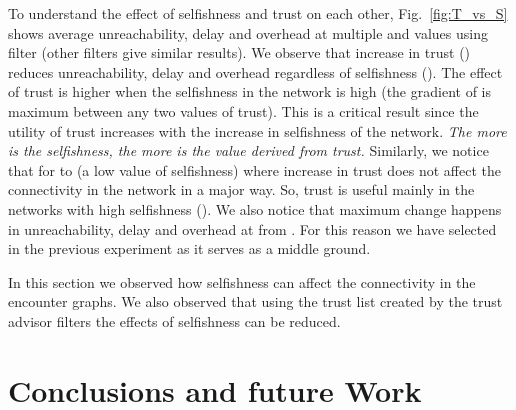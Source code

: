 \documentclass[10pt,conference]{IEEEtran}
\begin{document}
 
To understand the effect of selfishness and trust on each other, Fig.~\ref{fig:T_vs_S} shows average unreachability, delay and overhead at multiple  and  values using  filter (other filters give similar results). We observe that increase in trust () reduces unreachability, delay and overhead regardless of selfishness (). The effect of trust is higher when the selfishness in the network is high (the gradient of  is maximum between any two values of trust). This is a critical result since the utility of trust increases with the increase in selfishness of the network. \textit{The more is the selfishness, the more is the value derived from trust.} Similarly, we notice that for    to  (a low value of selfishness) where increase in  trust does not affect the connectivity in the network in a major way. So, trust is useful mainly in the networks with high selfishness (). We also notice that maximum change happens in unreachability, delay and overhead at  from . 
For this reason we have selected  in the previous experiment as it serves as  a middle ground.






\begin{figure*}[htp]
  \begin{center}
\renewcommand{\thesubfigure}{\Alph{subfigure}.}

    \centering
    
     
    \caption{Average Unreachability, Delay and Overhead at various values of T and S for  filter}
    \label{fig:T_vs_S}
  \end{center}	
\end{figure*}

In this section we observed how selfishness can affect the connectivity in the encounter graphs. We also observed that using the trust list created by the trust advisor filters the effects of selfishness can be reduced. 








\section{Conclusions and future Work} \label{future}
\end{document}
